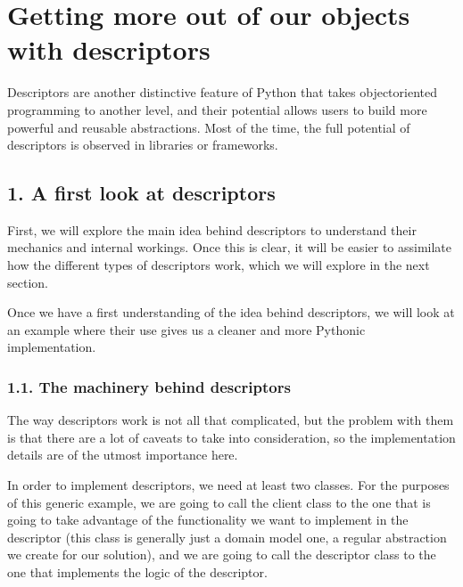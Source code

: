 \documentclass[a4paper,10pt,english]{sphinxmanual}
\begin{document}
\chapter{Getting more out of our objects with descriptors}
\label{\detokenize{chapters/6_descriptors/index:getting-more-out-of-our-objects-with-descriptors}}\label{\detokenize{chapters/6_descriptors/index::doc}}
Descriptors are another distinctive feature of Python that takes object\sphinxhyphen{}oriented
programming to another level, and their potential allows users to build more powerful and
reusable abstractions. Most of the time, the full potential of descriptors is observed in
libraries or frameworks.


\section{1. A first look at descriptors}
\label{\detokenize{chapters/6_descriptors/index:a-first-look-at-descriptors}}
First, we will explore the main idea behind descriptors to understand their mechanics and
internal workings. Once this is clear, it will be easier to assimilate how the different types of
descriptors work, which we will explore in the next section.

Once we have a first understanding of the idea behind descriptors, we will look at an
example where their use gives us a cleaner and more Pythonic implementation.


\subsection{1.1. The machinery behind descriptors}
\label{\detokenize{chapters/6_descriptors/index:the-machinery-behind-descriptors}}
The way descriptors work is not all that complicated, but the problem with them is that
there are a lot of caveats to take into consideration, so the implementation details are of the
utmost importance here.

In order to implement descriptors, we need at least two classes. For the purposes of this
generic example, we are going to call the client class to the one that is going to take
advantage of the functionality we want to implement in the descriptor (this class is
generally just a domain model one, a regular abstraction we create for our solution), and we
are going to call the descriptor class to the one that implements the logic of the
descriptor.
\end{document}
